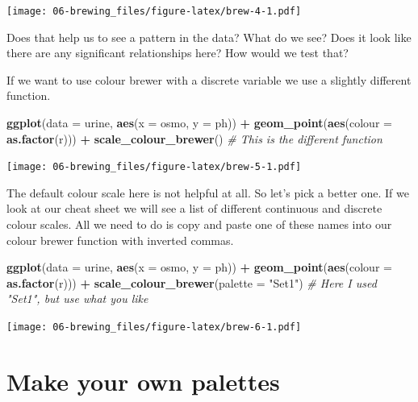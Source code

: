 \documentclass[]{book}
\newenvironment{Shaded}{\begin{snugshade}}{\end{snugshade}}
\newcommand{\KeywordTok}[1]{\textcolor[rgb]{0.13,0.29,0.53}{\textbf{#1}}}
\newcommand{\DataTypeTok}[1]{\textcolor[rgb]{0.13,0.29,0.53}{#1}}
\newcommand{\StringTok}[1]{\textcolor[rgb]{0.31,0.60,0.02}{#1}}
\newcommand{\CommentTok}[1]{\textcolor[rgb]{0.56,0.35,0.01}{\textit{#1}}}
\newcommand{\OperatorTok}[1]{\textcolor[rgb]{0.81,0.36,0.00}{\textbf{#1}}}
\newcommand{\NormalTok}[1]{#1}
\theoremstyle{definition}
\theoremstyle{definition}
\theoremstyle{definition}
\theoremstyle{remark}
\begin{document}
\texttt{[image: 06-brewing\_files/figure-latex/brew-4-1.pdf]}

Does that help us to see a pattern in the data? What do we see? Does it
look like there are any significant relationships here? How would we
test that?

If we want to use colour brewer with a discrete variable we use a
slightly different function.

\begin{Shaded}
\begin{Highlighting}[]
\KeywordTok{ggplot}\NormalTok{(}\DataTypeTok{data =}\NormalTok{ urine, }\KeywordTok{aes}\NormalTok{(}\DataTypeTok{x =}\NormalTok{ osmo, }\DataTypeTok{y =}\NormalTok{ ph)) }\OperatorTok{+}
\StringTok{  }\KeywordTok{geom_point}\NormalTok{(}\KeywordTok{aes}\NormalTok{(}\DataTypeTok{colour =} \KeywordTok{as.factor}\NormalTok{(r))) }\OperatorTok{+}
\StringTok{  }\KeywordTok{scale_colour_brewer}\NormalTok{() }\CommentTok{# This is the different function}
\end{Highlighting}
\end{Shaded}

\texttt{[image: 06-brewing\_files/figure-latex/brew-5-1.pdf]}

The default colour scale here is not helpful at all. So let's pick a
better one. If we look at our cheat sheet we will see a list of
different continuous and discrete colour scales. All we need to do is
copy and paste one of these names into our colour brewer function with
inverted commas.

\begin{Shaded}
\begin{Highlighting}[]
\KeywordTok{ggplot}\NormalTok{(}\DataTypeTok{data =}\NormalTok{ urine, }\KeywordTok{aes}\NormalTok{(}\DataTypeTok{x =}\NormalTok{ osmo, }\DataTypeTok{y =}\NormalTok{ ph)) }\OperatorTok{+}
\StringTok{  }\KeywordTok{geom_point}\NormalTok{(}\KeywordTok{aes}\NormalTok{(}\DataTypeTok{colour =} \KeywordTok{as.factor}\NormalTok{(r))) }\OperatorTok{+}
\StringTok{  }\KeywordTok{scale_colour_brewer}\NormalTok{(}\DataTypeTok{palette =} \StringTok{"Set1"}\NormalTok{) }\CommentTok{# Here I used "Set1", but use what you like}
\end{Highlighting}
\end{Shaded}

\texttt{[image: 06-brewing\_files/figure-latex/brew-6-1.pdf]}

\section{Make your own palettes}\label{make-your-own-palettes}
\end{document}
